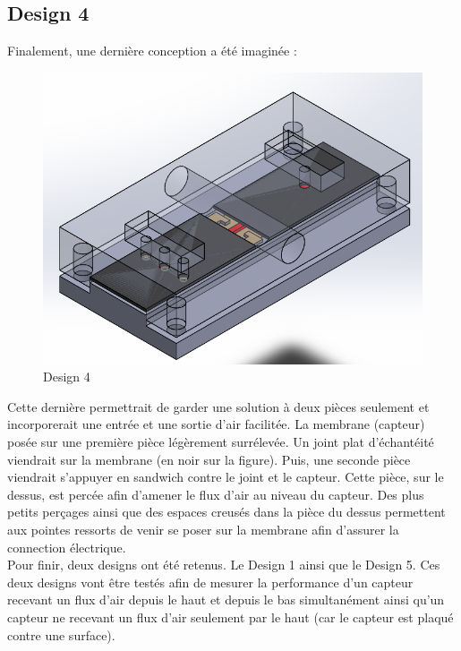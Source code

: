 \subsection{Design 4}
Finalement, une dernière conception a été imaginée :
\begin{figure}[H]
    \centering
    \includegraphics[scale = 0.3]{images/Design5_int_caoutch.png}
    \caption{Design 4}
    \label{fig:design5}
\end{figure}

Cette dernière permettrait de garder une solution à deux pièces seulement et incorporerait une entrée et une sortie d'air facilitée.
La membrane (capteur) posée sur une première pièce légèrement surrélevée. Un joint plat d'échantéité viendrait sur la membrane (en noir
sur la figure). Puis, une seconde pièce viendrait s'appuyer en sandwich contre le joint et le capteur. Cette pièce, sur le dessus, est
percée afin d'amener le flux d'air au niveau du capteur. Des plus petits perçages ainsi que des espaces creusés dans la pièce du dessus
permettent aux pointes ressorts de venir se poser sur la membrane afin d'assurer la connection électrique.\\

Pour finir, deux designs ont été retenus. Le Design 1 ainsi que le Design 5. Ces deux designs vont être testés afin de mesurer la
performance d'un capteur recevant un flux d'air depuis le haut et depuis le bas simultanément ainsi qu'un capteur ne recevant un flux
d'air seulement par le haut (car le capteur est plaqué contre une surface).